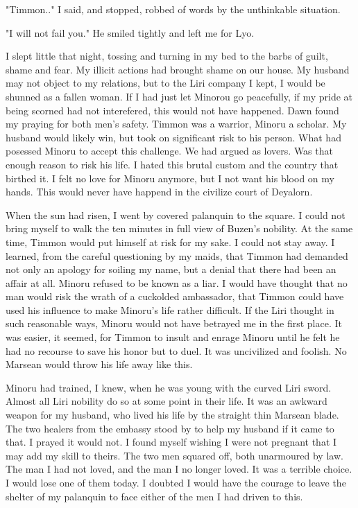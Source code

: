 \documentclass{article}
\begin{document}
"Timmon.." I said, and stopped, robbed of words by the unthinkable situation.

"I will not fail you." He smiled tightly and left me for Lyo.

I slept little that night, tossing and turning in my bed to the barbs of guilt, shame and fear. My illicit actions had brought shame on our house. My husband may not object to my relations, but to the Liri company I kept, I would be shunned as a fallen woman. If I had just let Minorou go peacefully, if my pride at being scorned had not interefered, this would not have happened. Dawn found my praying for both men's safety. Timmon was a warrior, Minoru a scholar. My husband would likely win, but took on significant risk to his person. What had posessed Minoru to accept this challenge. We had argued as lovers. Was that enough reason to risk his life. I hated this brutal custom and the country that birthed it. I felt no love for Minoru anymore, but I not want his blood on my hands. This would never have happend in the civilize court of Deyalorn.

When the sun had risen, I went by covered palanquin to the square. I could not bring myself to walk the ten minutes in full view of Buzen's nobility. At the same time, Timmon would put himself at risk for my sake. I could not stay away. I learned, from the careful questioning by my maids, that Timmon had demanded not only an apology for soiling my name, but a denial that there had been an affair at all. Minoru refused to be known as a liar. I would have thought that no man would risk the wrath of a cuckolded ambassador, that Timmon could have used his influence to make Minoru's life rather difficult. If the Liri thought in such reasonable ways, Minoru would not have betrayed me in the first place. It was easier, it seemed, for Timmon to insult and enrage Minoru until he felt he had no recourse to save his honor but to duel. It was uncivilized and foolish. No Marsean would throw his life away like this.

Minoru had trained, I knew, when he was young with the curved Liri sword. Almost all Liri nobility do so at some point in their life. It was an awkward weapon for my husband, who lived his life by the straight thin Marsean blade. The two healers from the embassy stood by to help my husband if it came to that. I prayed it would not. I found myself wishing I were not pregnant that I may add my skill to theirs. The two men squared off, both unarmoured by law.  The man I had not loved, and the man I no longer loved. It was a terrible choice. I would lose one of them today. I doubted I would have the courage to leave the shelter of my palanquin to face either of the men I had driven to this. 
\end{document}
